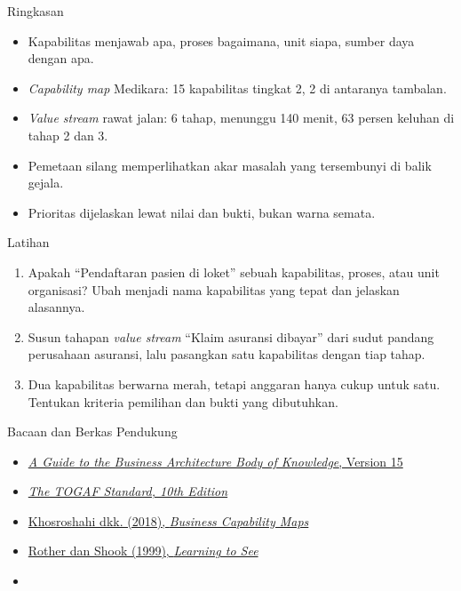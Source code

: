 \documentclass[aspectratio=169, table, 12pt]{beamer}
\begin{document}
\begin{frame}{{\Large Ringkasan}}
  \vspace{10pt}
  \begin{itemize}
    \item Kapabilitas menjawab apa, proses bagaimana, unit siapa, sumber daya dengan apa.
    \item \textit{Capability map} Medikara: 15 kapabilitas tingkat 2, 2 di antaranya tambalan.
    \item \textit{Value stream} rawat jalan: 6 tahap, menunggu 140 menit, 63 persen keluhan di tahap 2 dan 3.
    \item Pemetaan silang memperlihatkan akar masalah yang tersembunyi di balik gejala.
    \item Prioritas dijelaskan lewat nilai dan bukti, bukan warna semata.
  \end{itemize}
\end{frame}

\begin{frame}{{\Large Latihan}}
  \vspace{10pt}
  \begin{enumerate}
    \item Apakah ``Pendaftaran pasien di loket'' sebuah kapabilitas, proses, atau unit organisasi?
          Ubah menjadi nama kapabilitas yang tepat dan jelaskan alasannya.
    \item Susun tahapan \textit{value stream} ``Klaim asuransi dibayar'' dari sudut pandang perusahaan
          asuransi, lalu pasangkan satu kapabilitas dengan tiap tahap.
    \item Dua kapabilitas berwarna merah, tetapi anggaran hanya cukup untuk satu. Tentukan kriteria
          pemilihan dan bukti yang dibutuhkan.
  \end{enumerate}
\end{frame}

\begin{frame}{{\Large Bacaan dan Berkas Pendukung}}
  \vspace{10pt}
  \begin{itemize}
    \item \href{https://cdn.ymaws.com/www.businessarchitectureguild.org/resource/resmgr/bizbok15/BIZBOKv15_introduction.pdf}{\textit{A Guide to the Business Architecture Body of Knowledge}, Version 15}
    \item \href{https://www.opengroup.org/togaf}{\textit{The TOGAF Standard, 10th Edition}}
    \item \href{https://doi.org/10.24251/HICSS.2018.581}{Khosroshahi dkk. (2018), \textit{Business Capability Maps}}
    \item \href{https://www.lean.org/store/book/learning-to-see/}{Rother dan Shook (1999), \textit{Learning to See}}
    \item {}
  \end{itemize}
\end{frame}
\end{document}
